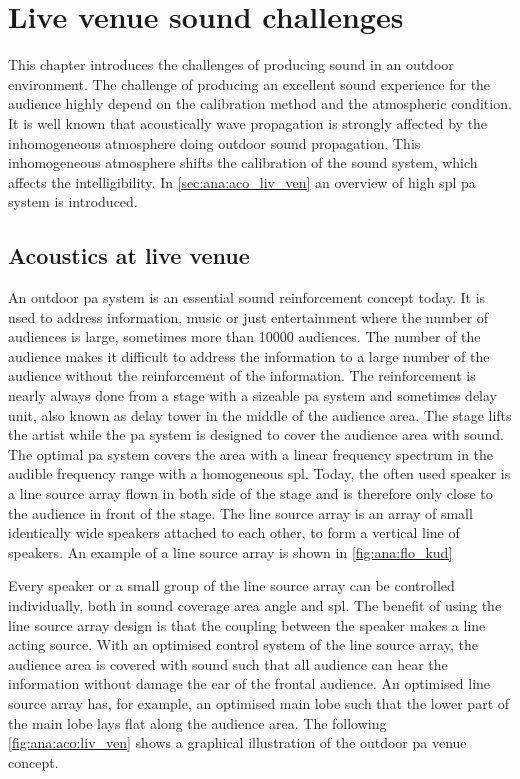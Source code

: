 \section{Live venue sound challenges}
This chapter introduces the challenges of producing sound in an outdoor environment. The challenge of producing an excellent sound experience for the audience highly depend on the calibration method and the atmospheric condition. It is well known that acoustically wave propagation is strongly affected by the inhomogeneous atmosphere doing outdoor sound propagation. This inhomogeneous atmosphere shifts the calibration of the sound system, which affects the intelligibility. In \autoref{sec:ana:aco_liv_ven} an overview of high \gls{spl} \gls{pa} system is introduced.



\subsection{Acoustics at live venue}\label{sec:ana:aco_liv_ven}
An outdoor \gls{pa} system is an essential sound reinforcement concept today. It is used to address information, music or just entertainment where the number of audiences is large, sometimes more than 10000 audiences. The number of the audience makes it difficult to address the information to a large number of the audience without the reinforcement of the information. The reinforcement is nearly always done from a stage with a sizeable \gls{pa} system and sometimes delay unit, also known as delay tower in the middle of the audience area. The stage lifts the artist while the \gls{pa} system is designed to cover the audience area with sound. The optimal \gls{pa} system covers the area with a linear frequency spectrum in the audible frequency range with a homogeneous \gls{spl}. Today, the often used speaker is a line source array flown in both side of the stage and is therefore only close to the audience in front of the stage. The line source array is an array of small identically wide speakers attached to each other, to form a vertical line of speakers. An example of a line source array is shown in \autoref{fig:ana:flo_kud}


Every speaker or a small group of the line source array can be controlled individually, both in sound coverage area angle and \gls{spl}. The benefit of using the line source array design is that the coupling between the speaker makes a line acting source. With an optimised control system of the line source array, the audience area is covered with sound such that all audience can hear the information without damage the ear of the frontal audience. An optimised line source array has, for example, an optimised main lobe such that the lower part of the main lobe lays flat along the audience area.
The following \autoref{fig:ana:aco:liv_ven} shows a graphical illustration of the outdoor \gls{pa} venue concept.

